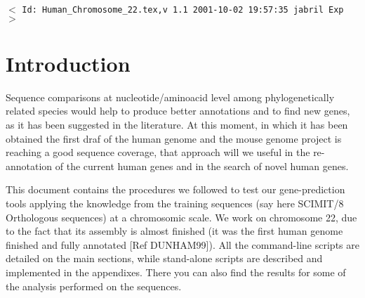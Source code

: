 \documentclass[11pt]{article}
\newcommand{\sctn}[1]{\section{#1}}
\begin{document}
\tableofcontents
\listoftables
\listoffigures

\vfill
\begin{center}
{\small$<$ \verb$Id: Human_Chromosome_22.tex,v 1.1 2001-10-02 19:57:35 jabril Exp $$>$ }
\end{center}


\newpage
{}
\setcounter{page}{1}

\sctn{Introduction}

Sequence comparisons at nucleotide/aminoacid level among phylogenetically related species would help to produce better annotations and to find new genes, as it has been suggested in the literature. At this moment, in which it has been obtained the first draf of the human genome and the mouse genome project is reaching a good sequence coverage, that approach will we useful in the re-annotation of the current human genes and in the search of novel human genes. 
\begin{comment}
Homology between human and mouse sequences serves as a useful guide for identifying genes in both organisms. Additionally, conserved sequences that have no coding potential are good candidates for regulatory elements.
-- From \url|http://bio.cse.psu.edu/mousegroup/doc.html|
An annotation of the orthologous test set of genomic sequences and their regulatory regions is available at \url|http://bio.cse.psu.edu/mousegroup/test8/|
\end{comment}

This document contains the procedures we followed to test our gene-prediction tools applying the knowledge from the training sequences (say here SCIMIT/8 Orthologous sequences) at a chromosomic scale. We work on chromosome 22, due to the fact that its assembly is almost finished (it was the first human genome finished and fully annotated [Ref DUNHAM99]). All the command-line scripts are detailed on the main sections, while stand-alone scripts are described and implemented in the appendixes. There you can also find the results for some of the analysis performed on the sequences. 
\end{document}
